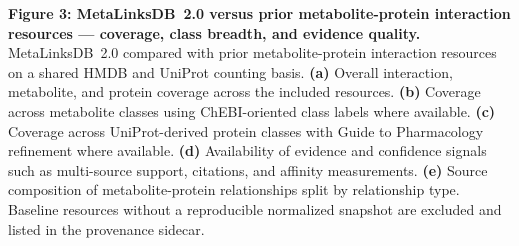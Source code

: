 \textbf{Figure 3: MetaLinksDB~2.0 versus prior metabolite-protein interaction resources --- coverage, class breadth, and evidence quality.}
MetaLinksDB~2.0 compared with prior metabolite-protein interaction resources on a shared HMDB and UniProt counting basis.
\textbf{(a)} Overall interaction, metabolite, and protein coverage across the included resources.
\textbf{(b)} Coverage across metabolite classes using ChEBI-oriented class labels where available.
\textbf{(c)} Coverage across UniProt-derived protein classes with Guide to Pharmacology refinement where available.
\textbf{(d)} Availability of evidence and confidence signals such as multi-source support, citations, and affinity measurements.
\textbf{(e)} Source composition of metabolite-protein relationships split by relationship type.
Baseline resources without a reproducible normalized snapshot are excluded and listed in the provenance sidecar.
